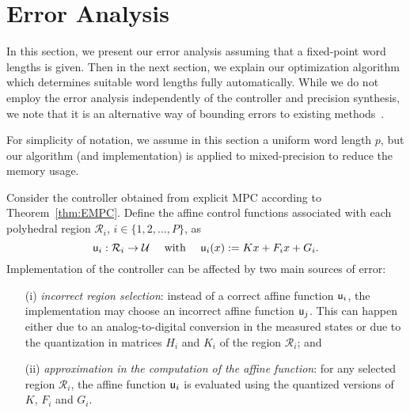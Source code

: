 \section{Error Analysis}
\label{sec:Error_Analysis}

In this section, we present our error analysis assuming that a fixed-point word lengths is given.
Then in the next section, we explain our optimization algorithm which determines suitable word
lengths fully automatically.%
While we do not employ the error analysis independently of the controller and
precision synthesis, we note that it is an alternative way of bounding errors to
existing methods~\cite{imperialrmpc}.

For simplicity of notation, we assume in this section a uniform word length $p$,
but our algorithm (and implementation) is applied to mixed-precision to reduce the memory usage.

Consider the controller obtained from explicit MPC according to Theorem~\ref{thm:EMPC}.
Define the affine control functions associated with each polyhedral region $\mathcal R_i$, $i\in\{1,2,\ldots, P\}$, as
$$\mathsf u_{{i}}:\mathcal R_i\rightarrow \mathcal U \quad \text{ with } \quad \mathsf u_{{i}}(x) := Kx + F_i x + G_i.$$
Implementation of the controller can be affected by two main sources of
error:
\begin{itemize}
  \item[(i)] \emph{incorrect region selection}:
   instead of a correct affine function $\mathsf u_{{i}}$, the implementation may choose an incorrect affine function $\mathsf u_{{j}}$. This can happen either
    due to an analog-to-digital conversion in the measured states or due to the quantization in matrices $H_i$ and $K_i$ of the region $\mathcal R_i$; and
    
  \item[(ii)] \emph{approximation in the computation of the affine function}: for any selected region $\mathcal R_i$, the affine function $\mathsf u_{{i}}$ is evaluated using the quantized versions of $K$, $F_i$ and $G_i$.
\end{itemize}

